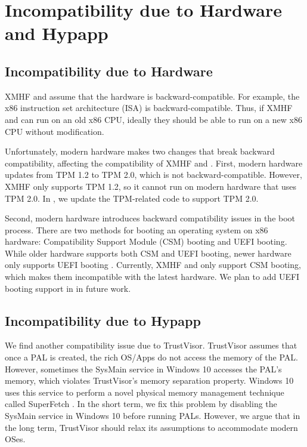 \section{Incompatibility due to Hardware and Hypapp}
\label{sec:discussion_compatibility_challenge}

\subsection{Incompatibility due to Hardware}

XMHF and  assume that the hardware is backward-compatible. For example, the x86 instruction set architecture (ISA) is backward-compatible. Thus, if XMHF and  can run on an old x86 CPU, ideally they should be able to run on a new x86 CPU without modification.

Unfortunately, modern hardware makes two changes that break backward compatibility, affecting the compatibility of XMHF and . First, modern hardware updates from TPM 1.2 to TPM 2.0, which is not backward-compatible. However, XMHF only supports TPM 1.2, so it cannot run on modern hardware that uses TPM 2.0. In , we update the TPM-related code to support TPM 2.0.

Second, modern hardware introduces backward compatibility issues in the boot process. There are two methods for booting an operating system on x86 hardware: Compatibility Support Module (CSM) booting and UEFI booting. While older hardware supports both CSM and UEFI booting, newer hardware only supports UEFI booting \cite{intel_drop_bios}. Currently, XMHF and  only support CSM booting, which makes them incompatible with the latest hardware. We plan to add UEFI booting support in  in future work.

\subsection{Incompatibility due to Hypapp}

We find another compatibility issue due to TrustVisor. TrustVisor assumes that once a PAL is created, the rich OS/Apps do not access the memory of the PAL. However, sometimes the SysMain service in Windows 10 accesses the PAL's memory, which violates TrustVisor's memory separation property. Windows 10 uses this service to perform a novel physical memory management technique called SuperFetch \cite{yosifovich2017windows}. In the short term, we fix this problem by disabling the SysMain service in Windows 10 before running PALs. However, we argue that in the long term, TrustVisor should relax its assumptions to accommodate modern OSes.


